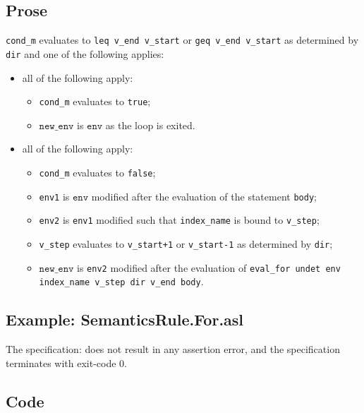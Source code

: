 \documentclass{book}
\newcommand\newenv[0]{\texttt{new\_env}}
\newcommand\env[0]{\texttt{env}}
\begin{document}
    \subsection{Prose}
    \texttt{cond\_m} evaluates to \texttt{leq v\_end v\_start} or \texttt{geq
v\_end v\_start} as determined by \texttt{dir} and one of the following
applies:
    \begin{itemize}
    \item all of the following apply:
      \begin{itemize}
      \item \texttt{cond\_m} evaluates to \texttt{true};
      \item $\newenv$ is $\env$ as the loop is exited.
      \end{itemize}
    \item all of the following apply:
      \begin{itemize}
      \item \texttt{cond\_m} evaluates to \texttt{false};
      \item \texttt{env1} is $\env$ modified after the evaluation of the statement \texttt{body};
      \item \texttt{env2} is \texttt{env1} modified such that \texttt{index\_name} is bound to \texttt{v\_step};
      \item \texttt{v\_step} evaluates to \texttt{v\_start+1} or \texttt{v\_start-1} as determined by \texttt{dir};
      \item $\newenv$ is \texttt{env2} modified after the evaluation of \texttt{eval\_for undet
        env index\_name v\_step dir v\_end body}.
      \end{itemize}
    \end{itemize}

    \subsection{Example: SemanticsRule.For.asl}
    The specification:
    does not result in any assertion error, and the specification terminates with exit-code $0$.

    \subsection{Code}
\end{document}
